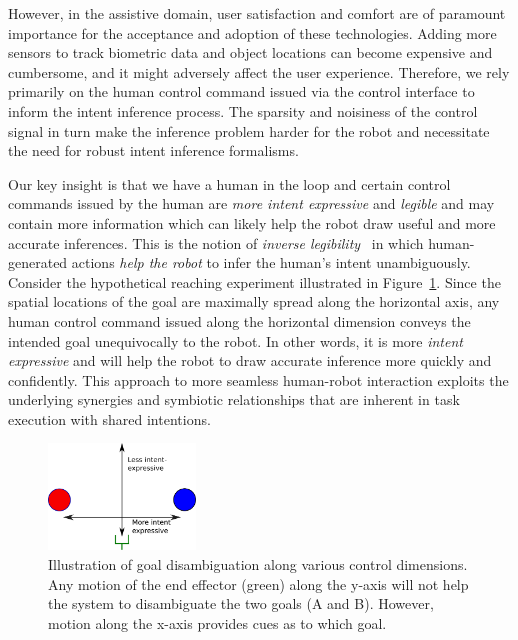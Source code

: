 However, in the assistive domain, user satisfaction and comfort are of paramount importance for the acceptance and adoption of these technologies. Adding more sensors to track biometric data and object locations can become expensive and cumbersome, and it might adversely affect the user experience. Therefore, we rely primarily on the human control command issued via the control interface to inform the intent inference process. The sparsity and noisiness of the control signal in turn make the inference problem harder for the robot and necessitate the need for robust intent inference formalisms. 

Our key insight is that we have a human in the loop and certain control commands issued by the human are \textit{more intent expressive} and \textit{legible} and may contain more information which can likely help the robot draw useful and more accurate inferences. This is the notion of \textit{inverse legibility}~\cite{gopinath2017mode} in which human-generated actions \textit{help the robot} to infer the human's intent unambiguously. Consider the hypothetical reaching experiment illustrated in Figure~\ref{fig:disamb}. Since the spatial locations of the goal are maximally spread along the horizontal axis, any human control command issued along the horizontal dimension conveys the intended goal unequivocally to the robot. In other words, it is more \textit{intent expressive} and will help the robot to draw accurate inference more quickly and confidently. This approach to more seamless human-robot interaction exploits the underlying synergies and symbiotic relationships that are inherent in task execution with shared intentions. 
\begin{figure}
	\begin{center}
		\includegraphics[width=0.35\textwidth]{./figures/Fig1_Disamb.eps}
	\end{center}
	\caption{Illustration of goal disambiguation along various control dimensions. Any motion of the end effector (green) along the y-axis will not help the system to disambiguate the two goals (A and B). However, motion along the x-axis provides cues as to which goal.}
	\label{fig:disamb}
\end{figure}

